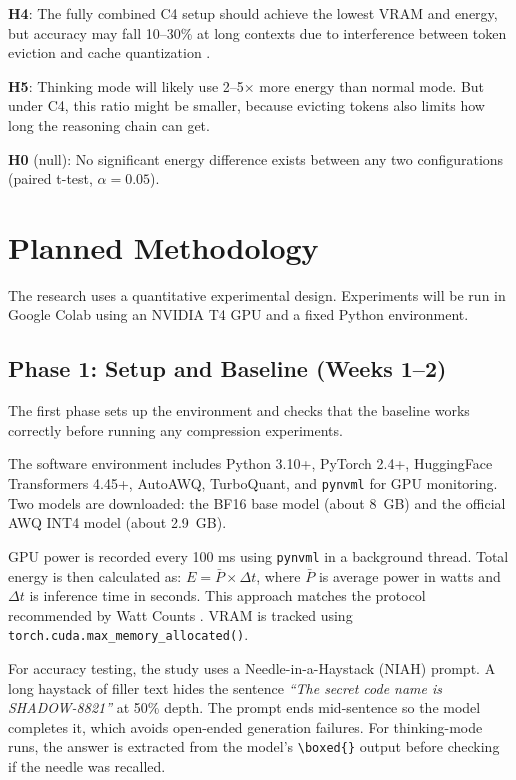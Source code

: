 \documentclass[conference]{IEEEtran}
\begin{document}
\textbf{H4}: The fully combined C4 setup should achieve the lowest VRAM and energy, but accuracy may fall 10--30\% at long contexts due to interference between token eviction and cache quantization \cite{rdkv, salfati2026}.

\textbf{H5}: Thinking mode will likely use 2--5$\times$ more energy than normal mode. But under C4, this ratio might be smaller, because evicting tokens also limits how long the reasoning chain can get.

\textbf{H0} (null): No significant energy difference exists between any two configurations (paired t-test, $\alpha = 0.05$).


\section{Planned Methodology}

The research uses a quantitative experimental design. Experiments will be run in Google Colab using an NVIDIA T4 GPU and a fixed Python environment.

\subsection{Phase 1: Setup and Baseline (Weeks 1--2)}

The first phase sets up the environment and checks that the baseline works correctly before running any compression experiments.

The software environment includes Python 3.10+, PyTorch 2.4+, HuggingFace Transformers 4.45+, AutoAWQ, TurboQuant, and \texttt{pynvml} for GPU monitoring. Two models are downloaded: the BF16 base model (about 8~GB) and the official AWQ INT4 model (about 2.9~GB).

GPU power is recorded every 100 ms using \texttt{pynvml} in a background thread. Total energy is then calculated as: $E = \bar{P} \times \Delta t$, where $\bar{P}$ is average power in watts and $\Delta t$ is inference time in seconds. This approach matches the protocol recommended by Watt Counts \cite{wattcounts}. VRAM is tracked using \texttt{torch.cuda.max\_memory\_allocated()}.

For accuracy testing, the study uses a Needle-in-a-Haystack (NIAH) prompt. A long haystack of filler text hides the sentence \textit{``The secret code name is SHADOW-8821''} at 50\% depth. The prompt ends mid-sentence so the model completes it, which avoids open-ended generation failures. For thinking-mode runs, the answer is extracted from the model's \texttt{\textbackslash boxed\{\}} output before checking if the needle was recalled.
\end{document}
